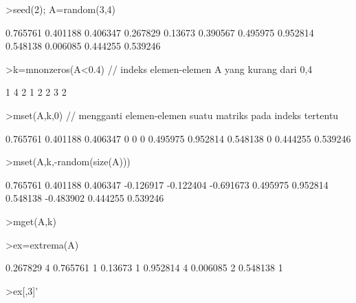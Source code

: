 \documentclass[a4paper,11pt,oneside,enabledeprecatedfontcommands]{scrbook}
\newenvironment{eulernotebook}{}{}
\begin{document}
\begin{eulernotebook}
\begin{eulerprompt}
>seed(2); A=random(3,4)
\end{eulerprompt}
\begin{euleroutput}
     0.765761      0.401188      0.406347      0.267829 
      0.13673      0.390567      0.495975      0.952814 
     0.548138      0.006085      0.444255      0.539246 
\end{euleroutput}
\begin{eulerprompt}
>k=mnonzeros(A<0.4) // indeks elemen-elemen A yang kurang dari 0,4
\end{eulerprompt}
\begin{euleroutput}
            1             4 
            2             1 
            2             2 
            3             2 
\end{euleroutput}
\begin{eulerprompt}
>mset(A,k,0) // mengganti elemen-elemen suatu matriks pada indeks tertentu
\end{eulerprompt}
\begin{euleroutput}
     0.765761      0.401188      0.406347             0 
            0             0      0.495975      0.952814 
     0.548138             0      0.444255      0.539246 
\end{euleroutput}
\begin{eulerprompt}
>mset(A,k,-random(size(A)))
\end{eulerprompt}
\begin{euleroutput}
     0.765761      0.401188      0.406347     -0.126917 
    -0.122404     -0.691673      0.495975      0.952814 
     0.548138     -0.483902      0.444255      0.539246 
\end{euleroutput}
\begin{eulerprompt}
>mget(A,k)
\end{eulerprompt}
\begin{euleroutput}
[0.267829,  0.13673,  0.390567,  0.006085]
\end{euleroutput}
\begin{eulerprompt}
>ex=extrema(A)
\end{eulerprompt}
\begin{euleroutput}
     0.267829             4      0.765761             1 
      0.13673             1      0.952814             4 
     0.006085             2      0.548138             1 
\end{euleroutput}
\begin{eulerprompt}
>ex[,3]'
\end{eulerprompt}
\begin{euleroutput}

\end{euleroutput}
\end{eulernotebook}
\end{document}
